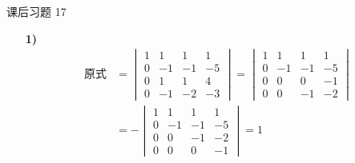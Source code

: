 \begin{problem}
	课后习题 17
	\begin{solution}
		\begin{enumerate}
			\item[\textbf{1)}]
			$$
			\begin{aligned}
				\text{原式} & = \begin{vmatrix}
					1 & 1 & 1 & 1 \\
					0 & -1 & -1 & -5 \\
					0 & 1 & 1 & 4 \\
					0 & -1 & -2 & -3
				\end{vmatrix} = \begin{vmatrix}
					1 & 1 & 1 & 1 \\
					0 & -1 & -1 & -5 \\
					0 & 0 & 0 & -1 \\
					0 & 0 & -1 & -2
				\end{vmatrix} \\
				& = -\begin{vmatrix}
					1 & 1 & 1 & 1 \\
					0 & -1 & -1 & -5 \\
					0 & 0 & -1 & -2 \\
					0 & 0 & 0 & -1
				\end{vmatrix} = 1 \\
			\end{aligned}
			$$


\end{enumerate}
\end{solution}
\end{problem}
